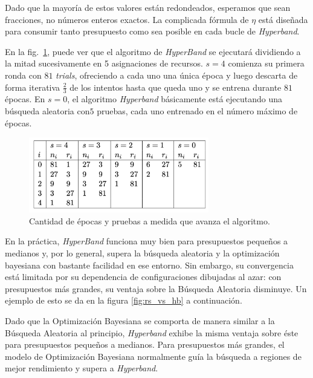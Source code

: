 \documentclass[a4paper,12pt]{article}
\begin{document}
Dado que la mayoría de estos valores están redondeados, esperamos que sean fracciones, no números enteros exactos. La complicada fórmula de $\eta$ está diseñada para consumir tanto presupuesto como sea posible en cada bucle de \textit{Hyperband}.

En la fig.~\ref{fig:hyper_epochs_trials}, puede ver que el algoritmo de \textit{HyperBand} se ejecutará dividiendo a la mitad sucesivamente en 5 asignaciones de recursos. $s=4$ comienza su primera ronda con $81$ \textit{trials}, ofreciendo a cada uno una única época y luego descarta de forma iterativa $\frac{2}{3}$ de los intentos hasta que queda uno y se entrena durante $81$ épocas. En $s=0$, el algoritmo \textit{Hyperband} básicamente está ejecutando una búsqueda aleatoria con$ 5$ pruebas, cada uno entrenado en el número máximo de épocas.

\begin{figure}[H]
	\begin{center}
	\includegraphics[width=0.7\textwidth]{hyper_trials_vs_epochs.png}
  	\caption{Cantidad de épocas y pruebas a medida que avanza el algoritmo.}
  	\label{fig:hyper_epochs_trials}
  	\end{center}
\end{figure}

En la práctica, \textit{HyperBand} funciona muy bien para presupuestos pequeños a medianos y, por lo general, supera la búsqueda aleatoria y la optimización bayesiana con bastante facilidad en ese entorno. Sin embargo, su convergencia está limitada por su dependencia de configuraciones dibujadas al azar: con presupuestos más grandes, su ventaja sobre la Búsqueda Aleatoria disminuye. Un ejemplo de esto se da en la figura \ref{fig:rs_vs_hb} a continuación. \citep{automl-bohb}

Dado que la Optimización Bayesiana se comporta de manera similar a la Búsqueda Aleatoria al principio, \textit{Hyperband} exhibe la misma ventaja sobre éste para presupuestos pequeños a medianos. Para presupuestos más grandes, el modelo de Optimización Bayesiana normalmente guía la búsqueda a regiones de mejor rendimiento y supera a \textit{Hyperband}.
\end{document}
